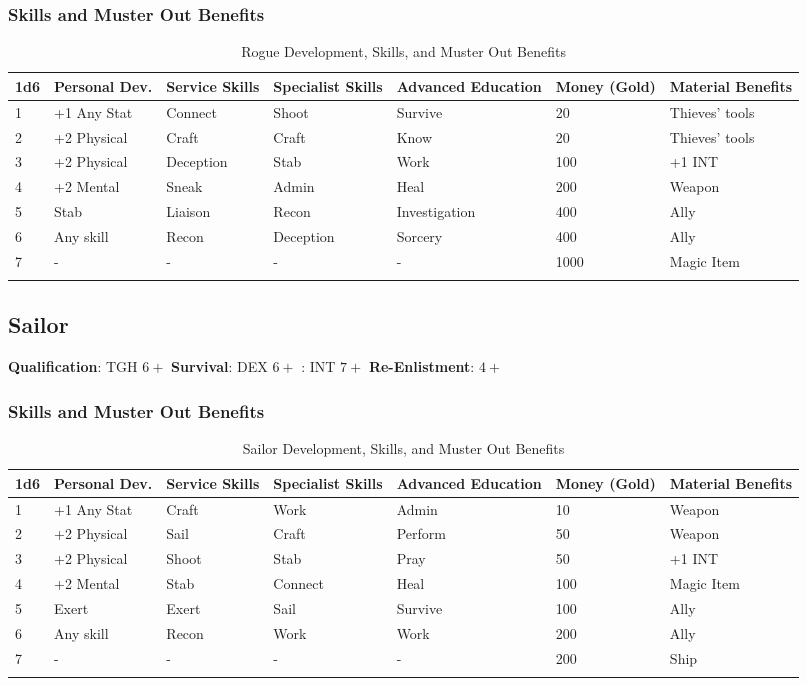 \documentclass[itdr/core]{subfiles}
\begin{document}
\subsubsection{Skills and Muster Out Benefits}
\begin{longtable}{p{} p{} p{} p{} p{} p{} p{}}
\hline
\textbf{1d6} & \textbf{Personal Dev.} & \textbf{Service Skills} & \textbf{Specialist Skills} & \textbf{Advanced Education} & \textbf{Money (Gold)} & \textbf{Material Benefits} \\
\hline
1 & +1 Any Stat & Connect & Shoot & Survive & 20 & Thieves' tools \\
2 & +2 Physical & Craft & Craft & Know & 20 & Thieves' tools \\
3 & +2 Physical & Deception & Stab & Work & 100 & +1 INT \\
4 & +2 Mental & Sneak & Admin & Heal & 200 & Weapon \\
5 & Stab & Liaison & Recon & Investigation & 400 & Ally \\
6 & Any skill & Recon & Deception & Sorcery & 400 & Ally \\
7 & - & - & - & - & 1000 & Magic Item \\
\hline
\caption{Rogue Development, Skills, and Muster Out Benefits}
\end{longtable}

\subsection{Sailor}
\textbf{Qualification}: TGH $6+$
\textbf{Survival}: DEX $6+$
: INT $7+$
\textbf{Re-Enlistment}: $4+$
\subsubsection{Skills and Muster Out Benefits}
\begin{longtable}{p{} p{} p{} p{} p{} p{} p{}}
\hline
\textbf{1d6} & \textbf{Personal Dev.} & \textbf{Service Skills} & \textbf{Specialist Skills} & \textbf{Advanced Education} & \textbf{Money (Gold)} & \textbf{Material Benefits} \\
\hline
1 & +1 Any Stat & Craft & Work & Admin & 10 & Weapon \\
2 & +2 Physical & Sail & Craft & Perform & 50 & Weapon \\
3 & +2 Physical & Shoot & Stab & Pray & 50 & +1 INT \\
4 & +2 Mental & Stab & Connect & Heal & 100 & Magic Item \\
5 & Exert & Exert & Sail & Survive & 100 & Ally \\
6 & Any skill & Recon & Work & Work & 200 & Ally \\
7 & - & - & - & - & 200 & Ship \\
\hline
\caption{Sailor Development, Skills, and Muster Out Benefits}
\end{longtable}
\end{document}
